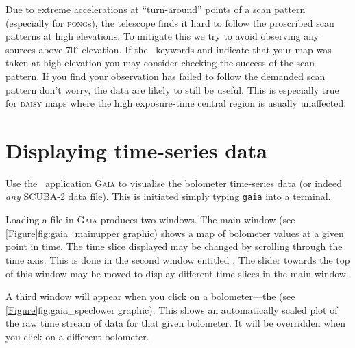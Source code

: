 \documentclass[11pt,oneside,chapters]{starlink}
\begin{document}
Due to extreme accelerations at ``turn-around'' points of a scan
pattern (especially for \textsc{pong}s), the telescope finds it hard
to follow the proscribed scan patterns at high elevations. To mitigate
this we try to avoid observing any sources above 70$^\circ$ elevation.
If the \fitslist\ keywords  and 
indicate that your map was taken at high elevation you may consider
checking the success of the scan pattern. If you find your observation
has failed to follow the demanded scan pattern don't worry, the data are
likely to still be useful. This is especially true for \textsc{daisy}
maps where the high exposure-time central region is usually
unaffected.

\section{Displaying time-series data}
\label{sec:gaiacube}

Use the \starlink\ application \textsc{Gaia} to visualise the bolometer
time-series data (or indeed \emph{any} SCUBA-2 data file). This is
initiated simply typing \texttt{gaia} into a terminal.

\begin{terminalv}
\end{terminalv}

Loading a file in \textsc{Gaia} produces two windows. The main window (see
\cref{Figure}{fig:gaia_main}{upper graphic}) shows a
map of bolometer values at a given point in time. The time slice
displayed may be changed by scrolling through the time axis. This is
done in the second window entitled . The  slider towards the top of this
window may be moved to display different time slices in the main
window.


A third window will appear when you click on a bolometer---the
 (see \cref{Figure}{fig:gaia_spec}{lower graphic}).
This shows an automatically scaled plot of the raw time stream of data for
that given bolometer. It will be overridden when you click on a different
bolometer.
\end{document}
